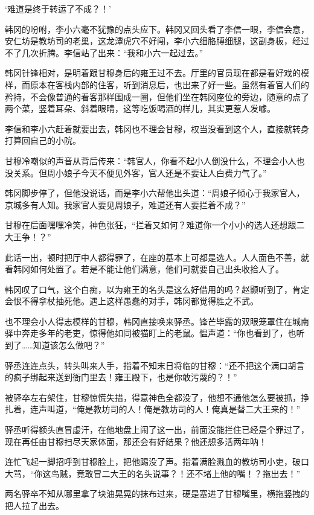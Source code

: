 ‘难道是终于转运了不成？！’

韩冈的吩咐，李小六毫不犹豫的点头应下。韩冈又回头看了李信一眼，李信会意，安仁坊是教坊司的老巢，这龙潭虎穴不好闯，李小六细胳膊细腿，这副身板，经过不了几次折腾。李信站了出来：“我和小六一起过去。”

韩冈针锋相对，是明着跟甘穆身后的雍王过不去。厅里的官员现在都是看好戏的模样，而原本在客栈内部的住客，听到消息后，也出来了好一些。虽然有着官人们的矜持，不会像普通的看客那样围成一圈，但他们坐在韩冈座位的旁边，随意的点了两个菜，竖着耳朵、斜着眼睛，这等吃饭喝酒的样儿，其实更惹人发噱。

李信和李小六赶着就要出去，韩冈也不理会甘穆，权当没看到这个人，直接就转身打算回自己的小院。

甘穆冷嘲似的声音从背后传来：“韩官人，你看不起小人倒没什么，不理会小人也没关系。但周小娘子今天不便见外客，官人还是不要让人白费力气了。”

韩冈脚步停了，但他没说话，而是李小六帮他出头道：“周娘子倾心于我家官人，京城多有人知。我家官人要见周娘子，难道还有人要拦着不成？”

甘穆在后面嘿嘿冷笑，神色张狂，“拦着又如何？难道你一个小小的选人还想跟二大王争！？”

此话一出，顿时把厅中人都得罪了，在座的基本上可都是选人。人人面色不善，就看韩冈如何处置了。若是不能让他们满意，他们可就要自己出头收拾人了。

韩冈叹了口气，这个白痴，以为雍王的名头是这么好借用的吗？赵颢听到了，肯定会恨不得拿杖抽死他。遇上这样愚蠢的对手，韩冈都觉得胜之不武。

也不理会小人得志模样的甘穆，韩冈直接唤来驿丞。锋芒毕露的双眼笼罩住在城南驿中奔走多年的老吏，惊得他如同被猫盯上的老鼠。愠声道：“你也看到了，也听到了……知道该怎么做吧？”

驿丞连连点头，转头叫来人手，指着不知末日将临的甘穆：“还不把这个满口胡言的疯子绑起来送到衙门里去！雍王殿下，也是你敢污蔑的？！”

被驿卒左右架住，甘穆惊慌失措，得意神色全都没了，他想不通他怎么要被抓，挣扎着，连声叫道，“俺是教坊司的人！俺是教坊司的人！俺真是替二大王来的！”

驿丞听得额头直冒虚汗，在他地盘上闹了这一出，前面没能拦住已经是个罪过了，现在再任由甘穆扫尽天家体面，那还会有好结果？他还想多活两年呐！

连忙飞起一脚招呼到甘穆脸上，把他踢没了声。指着满脸溅血的教坊司小吏，破口大骂，“你这鸟贼，竟敢冒二大王的名头说事？！还不堵上他的嘴！？拖出去！”

两名驿卒不知从哪里拿了块油晃晃的抹布过来，硬是塞进了甘穆嘴里，横拖竖拽的把人拉了出去。


